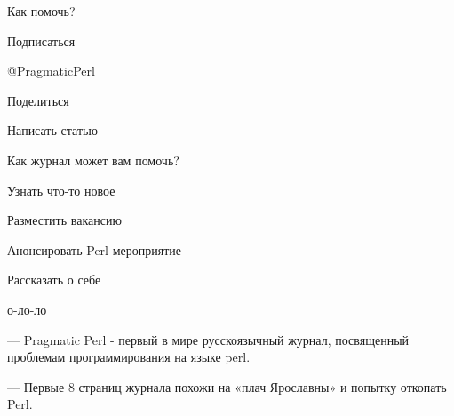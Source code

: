 \documentclass[14pt]{beamer}
\begin{document}
\begin{frame}
    \begin{center}
        Как помочь?
    \end{center}
\end{frame}

\begin{frame}
    \begin{center}
        Подписаться \pause

        @PragmaticPerl \pause

        Поделиться \pause

        Написать статью
    \end{center}
\end{frame}

\begin{frame}
    \begin{center}
        Как журнал может вам помочь?
    \end{center}
\end{frame}

\begin{frame}
    \begin{center}
        Узнать что-то новое \pause

        Разместить вакансию \pause

        Анонсировать Perl-мероприятие \pause

        Рассказать о себе
    \end{center}
\end{frame}

\begin{frame}
    \begin{center}
        о-ло-ло
    \end{center}
\end{frame}

\begin{frame}
    \begin{center}
        --- Pragmatic Perl - первый в мире русскоязычный журнал, посвященный
        проблемам программирования на языке perl.
    \end{center}
\end{frame}

\begin{frame}
    \begin{center}
        --- Первые 8 страниц журнала похожи на «плач Ярославны» и попытку
        откопать Perl.
    \end{center}
\end{frame}
\end{document}
